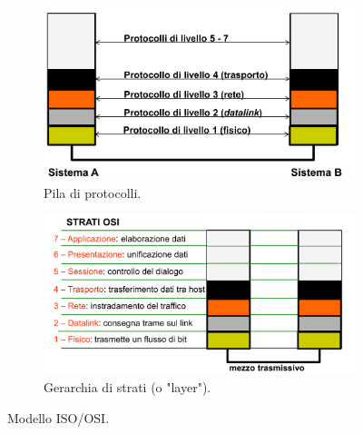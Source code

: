 \documentclass[11pt, italian, openany]{book}
\begin{document}
\begin{sloppypar}
\begin{figure}[h!]
	\begin{subfigure}[t]{0.49 \linewidth} \centering
		\includegraphics[scale=0.22]{images/stack-protocollare-iso_osi.png}
		\caption{Pila di protocolli.}
	\end{subfigure}
	\begin{subfigure}[t]{0.49 \linewidth} \centering
		\includegraphics[scale=0.22]{images/gerarchia-layer-iso_osi.png}
		\caption{Gerarchia di strati (o "layer").}
	\end{subfigure}
	\caption{Modello ISO/OSI.}
	\label{fig:iso-osi}
\end{figure}


\end{sloppypar}
\end{document}
